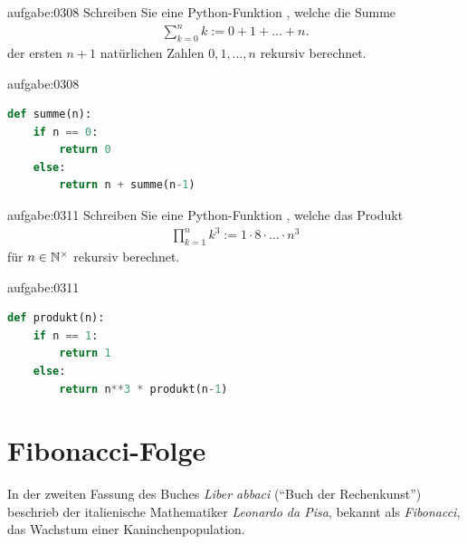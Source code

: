 \begin{aufgabe}{aufgabe:0308}
Schreiben Sie eine Python-Funktion , welche die Summe
\begin{align*}
    \sum_{k=0}^n k := 0 + 1 + \ldots + n.
\end{align*}
der ersten $n+1$ natürlichen Zahlen $0,1,\ldots ,n$ rekursiv berechnet.
\end{aufgabe}
\begin{antwort}{aufgabe:0308}
\begin{lstlisting}[language=Python,caption=rekursive Berechnung einer Summe]
def summe(n):
    if n == 0:
        return 0
    else:
        return n + summe(n-1)
\end{lstlisting}
\end{antwort}

\begin{aufgabe}{aufgabe:0311}
Schreiben Sie eine Python-Funktion , welche das Produkt
\begin{align*}
    \prod_{k=1}^n k^3 := 1 \cdot 8 \cdot \ldots \cdot n^3
\end{align*}
für $n\in\mathbb{N}^{\times}$ rekursiv berechnet.
\end{aufgabe}
\begin{antwort}{aufgabe:0311}
\begin{lstlisting}[language=Python,caption=rekursive Berechnung eines Produkts]
def produkt(n):
    if n == 1:
        return 1
    else:
        return n**3 * produkt(n-1)
\end{lstlisting}
\end{antwort}

\clearpage

\section{Fibonacci-Folge}
In der zweiten Fassung des Buches \textit{Liber abbaci} (\enquote{Buch der Rechenkunst}) beschrieb der italienische Mathematiker \textit{Leonardo da Pisa}, bekannt als \textit{Fibonacci}, das Wachstum einer Kaninchenpopulation.


